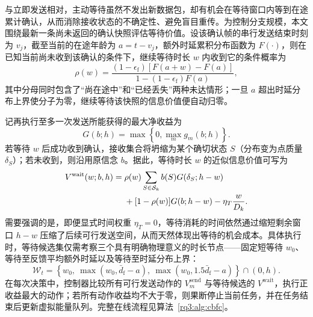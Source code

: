 与立即发送相对，主动等待虽然不发出新数据包，却有机会在等待窗口内等到在途累计确认，从而消除接收状态的不确定性、避免盲目重传。为控制分支规模，本文围绕最新一条尚未返回的确认快照评估等待价值。设该确认帧的串行发送结束时刻为 $v_j$，截至当前的在途年龄为 $a=t-v_j$，额外时延累积分布函数为 $F(\cdot)$，则在已知当前尚未收到该确认的条件下，继续等待时长 $w$ 内收到它的条件概率为
\begin{equation}
  \rho(w)=\frac{(1-\epsilon_{\mathrm f})[F(a+w)-F(a)]}
                {1-(1-\epsilon_{\mathrm f})F(a)},
  \label{rq3:eq:conditional-feedback}
\end{equation}
其中分母同时包含了“尚在途中”和“已经丢失”两种未达情形；一旦 $a$ 超出时延分布上界使分子为零，继续等待该快照的信息价值便自动归零。

记再执行至多一次发送所能获得的最大净收益为
\begin{equation}
  G(b;h)=\max\left\{0,\max_m g_m(b;h)\right\}.
  \label{rq3:eq:one-step-value}
\end{equation}
若等待 $w$ 后成功收到确认，接收集合将坍缩为某个确切状态 $S$（分布变为点质量 $\delta_S$）；若未收到，则沿用原信念 $b$。据此，等待时长 $w$ 的近似信息价值可写为
\begin{equation}
  \begin{split}
    V^{\mathrm{wait}}(w;b,h)
      ={}&\rho(w)\sum_{S\in\mathcal{S}_k}b(S)G(\delta_S;h-w)\\
         &+[1-\rho(w)]G(b;h-w)-\eta_T\frac{w}{D_k}.
  \end{split}
  \label{rq3:eq:waiting-value}
\end{equation}
需要强调的是，即便显式时间权重 $\eta_T=0$，等待消耗的时间依然通过缩短剩余窗口 $h-w$ 压缩了后续可行发送空间，从而天然体现出等待的机会成本。具体执行时，等待候选集仅需考察三个具有明确物理意义的时长节点——固定短等待 $w_0$、等待至反馈平均额外时延以及等待至时延分布上界：
\begin{equation}
  \mathcal W_t=\left\{w_0,\ \max(w_0,\bar d_{\mathrm f}-a),\
     \max(w_0,1.5\bar d_{\mathrm f}-a)\right\}\cap(0,h).
  \label{rq3:eq:wait-candidates}
\end{equation}
在每次决策中，控制器比较所有可行发送动作的 $V_m^{\mathrm{send}}$ 与等待候选的 $V^{\mathrm{wait}}$，执行正收益最大的动作；若所有动作收益均不大于零，则果断停止当前任务，并在任务结束后更新虚拟能量队列。完整在线流程见算法~\ref{rq3:alg:cbfc}。

